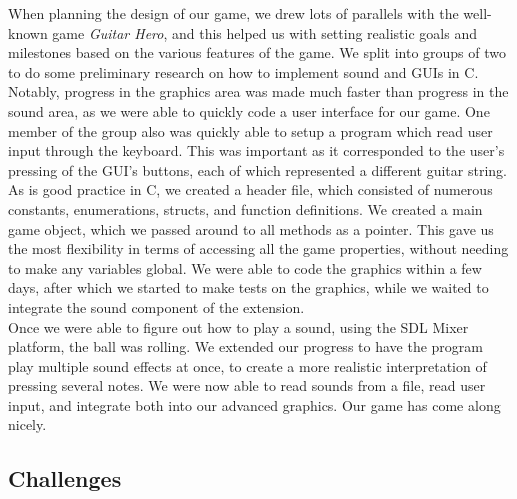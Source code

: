 \documentclass[11pt]{article}
\begin{document}
When planning the design of our game, we drew lots of parallels with the well-known game \emph{Guitar Hero}, and this helped us with setting realistic goals and milestones based on the various features of the game. We split into groups of two to do some preliminary research on how to implement sound and GUIs in C. Notably, progress in the graphics area was made much faster than progress in the sound area, as we were able to quickly code a user interface for our game. One member of the group also was quickly able to setup a program which read user input through the keyboard. This was important as it corresponded to the user's pressing of the GUI's buttons, each of which represented a different guitar string.
\\ \hspace{10mm} As is good practice in C, we created a header file, which consisted of numerous constants, enumerations, structs, and function definitions. We created a main game object, which we passed around to all methods as a pointer. This gave us the most flexibility in terms of accessing all the game properties, without needing to make any variables global. We were able to code the graphics within a few days, after which we started to make tests on the graphics, while we waited to integrate the sound component of the extension.
\\ \hspace{10mm} Once we were able to figure out how to play a sound, using the SDL Mixer platform, the ball was rolling. We extended our progress to have the program play multiple sound effects at once, to create a more realistic interpretation of pressing several notes. We were now able to read sounds from a file, read user input, and integrate both into our advanced graphics. Our game has come along nicely.

\subsection{Challenges}
\end{document}
